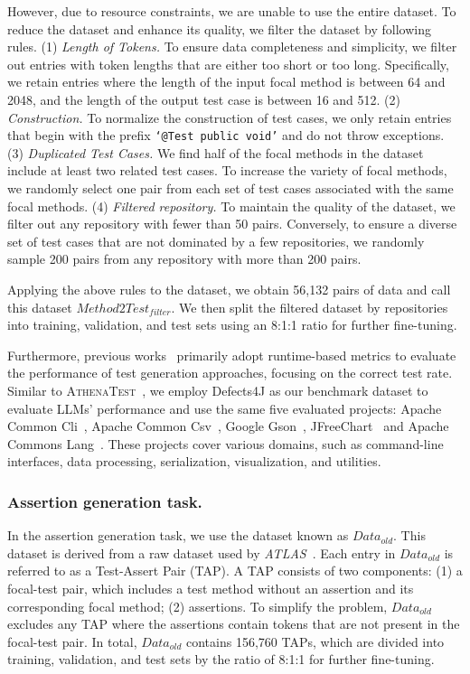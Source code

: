 However, due to resource constraints, we are unable to use the entire dataset. To reduce the dataset and enhance its quality, we filter the dataset by following rules.
(1) \textit{Length of Tokens.} To ensure data completeness and simplicity, we filter out entries with token lengths that are either too short or too long. Specifically, we retain entries where the length of the input focal method is between 64 and 2048, and the length of the output test case is between 16 and 512.  
(2) \textit{Construction.} To normalize the construction of test cases, we only retain entries that begin with the prefix \texttt{`@Test public void'} and do not throw exceptions.
(3) \textit{Duplicated Test Cases.} We find half of the focal methods in the dataset include at least two related test cases. To increase the variety of focal methods, we randomly select one pair from each set of test cases associated with the same focal methods.
(4) \textit{Filtered repository.} To maintain the quality of the dataset, we filter out any repository with fewer than 50 pairs. Conversely, to ensure a diverse set of test cases that are not dominated by a few repositories, we randomly sample 200 pairs from any repository with more than 200 pairs.

Applying the above rules to the dataset, we obtain 56,132 pairs of data and call this dataset $Method2Test_{filter}$. We then split the filtered dataset by repositories into training, validation, and test sets using an 8:1:1 ratio for further fine-tuning.


Furthermore, previous works~\cite{tufano_unit_2021, alagarsamy_a3test_2023, ni_casmodatest_2024} primarily adopt runtime-based metrics to evaluate the performance of test generation approaches, focusing on the correct test rate.
Similar to \textsc{AthenaTest}~\cite{tufano_unit_2021}, we employ Defects4J as our benchmark dataset to evaluate LLMs' performance and use the same five evaluated projects: Apache Common Cli~\cite{2023CLI}, Apache Common Csv~\cite{2023CSV}, Google Gson~\cite{2023gson}, JFreeChart~\cite{2023Chart} and Apache Commons Lang~\cite{2023Lang}. 
These projects cover various domains, such as command-line interfaces, data processing, serialization, visualization, and utilities. 



\subsubsection{Assertion generation task.}
In the assertion generation task, we use the dataset known as $Data_{old}$. This dataset is derived from a raw dataset used by \textit{ATLAS}~\cite{watson_learning_2020}. Each entry in $Data_{old}$ is referred to as a Test-Assert Pair (TAP). A TAP consists of two components: (1) a focal-test pair, which includes a test method without an assertion and its corresponding focal method; (2) assertions. 
To simplify the problem, $Data_{old}$ excludes any TAP where the assertions contain tokens that are not present in the focal-test pair. 
In total, $Data_{old}$ contains 156,760 TAPs, which are divided into training, validation, and test sets by the ratio of 8:1:1 for further fine-tuning.


